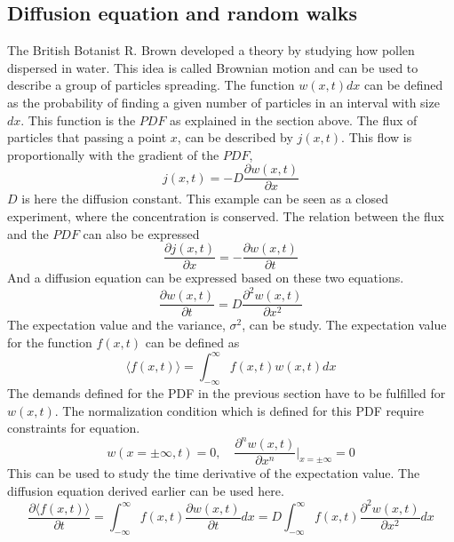 \documentclass[%
twoside,                 %
final,                   %
chapterprefix=true,      %
open=right               %
10pt]{book}
\begin{document}
\subsection{Diffusion equation and random walks}
The British Botanist R. Brown developed a theory by studying how pollen dispersed in water. This idea is called Brownian motion and can be used to describe a group of particles spreading. The function $w(x,t)dx$ can be defined as the probability of finding a given number of particles in an interval with size $dx$. This function is the $PDF$ as explained in the section above. The flux of particles that passing a point $x$, can be described by $j(x,t)$. This flow is proportionally with the gradient of the $PDF$,
\begin{equation}
j(x,t) = -D\frac{\partial w(x,t)}{\partial x}
\end{equation}
$D$ is here the diffusion constant. This example can be seen as a closed experiment, where the concentration is conserved. The relation between the flux and the $PDF$ can also be expressed
\begin{equation}
\frac{\partial j(x,t)}{\partial x} = -\frac{\partial w(x,t)}{\partial t} 
\end{equation}
And a diffusion equation can be expressed based on these two equations.
\begin{equation}
\frac{\partial w(x,t)}{\partial t} = D\frac{\partial^2 w(x,t)}{\partial x^2} 
\end{equation}
The expectation value and the variance, $\sigma^2$, can be study. The expectation value for the function $f(x,t)$ can be defined as
\begin{equation}
\langle f(x,t) \rangle = \int^{\infty}_{-\infty} f(x,t) w(x,t)dx
\end{equation}
The demands defined for the PDF in the previous section have to be fulfilled for $w(x,t)$. The normalization condition which is defined for this PDF require constraints for equation.
\begin{equation} \label{eq:PDF_demands}
w(x= \pm \infty,t) = 0,\quad \frac{\partial^nw(x,t)}{\partial x^n}|_{x=\pm\infty} = 0 
\end{equation}
This can be used to study the time derivative of the expectation value. The diffusion equation derived earlier can be used here.
\begin{equation}
\frac{\partial \langle f(x,t) \rangle}{\partial t} = \int^{\infty}_{-\infty} f(x,t) \frac{\partial w(x,t)}{\partial t}dx = D \int^{\infty}_{-\infty} f(x,t) \frac{\partial^2 w(x,t)}{\partial x^2}dx
\end{equation}
\end{document}
